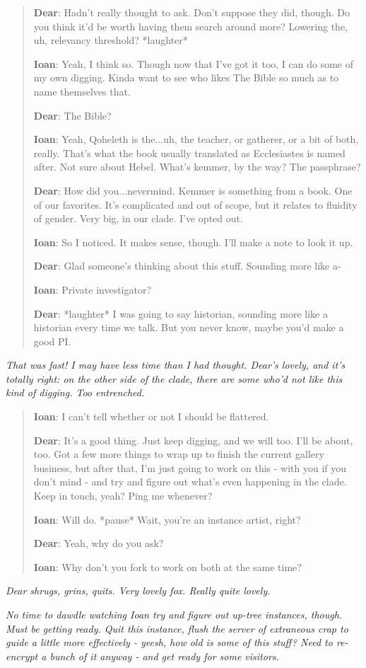 \begin{quote}
\textbf{Dear}: Hadn't really thought to ask. Don't suppose they did, though. Do you think it'd be worth having them search around more? Lowering the, uh, relevancy threshold? *laughter*

\textbf{Ioan}: Yeah, I think so. Though now that I've got it too, I can do some of my own digging. Kinda want to see who likes The Bible so much as to name themselves that.

\textbf{Dear}: The Bible?

\textbf{Ioan}: Yeah, Qoheleth is the...uh, the teacher, or gatherer, or a bit of both, really. That's what the book usually translated as Ecclesiastes is named after. Not sure about Hebel. What's kemmer, by the way? The passphrase?

\textbf{Dear}: How did you...nevermind. Kemmer is something from a book. One of our favorites. It's complicated and out of scope, but it relates to fluidity of gender. Very big, in our clade. I've opted out.

\textbf{Ioan}: So I noticed. It makes sense, though. I'll make a note to look it up.

\textbf{Dear}: Glad someone's thinking about this stuff. Sounding more like a-

\textbf{Ioan}: Private investigator?

\textbf{Dear}: *laughter* I was going to say historian, sounding more like a historian every time we talk. But you never know, maybe you'd make a good PI.
\end{quote}

\emph{That was fast! I may have less time than I had thought. Dear's lovely, and it's totally right: on the other side of the clade, there are some who'd not like this kind of digging. Too entrenched.}

\begin{quote}
\textbf{Ioan}: I can't tell whether or not I should be flattered.

\textbf{Dear}: It's a good thing. Just keep digging, and we will too. I'll be about, too. Got a few more things to wrap up to finish the current gallery business, but after that, I'm just going to work on this - with you if you don't mind - and try and figure out what's even happening in the clade. Keep in touch, yeah? Ping me whenever?

\textbf{Ioan}: Will do. *pause* Wait, you're an instance artist, right?

\textbf{Dear}: Yeah, why do you ask?

\textbf{Ioan}: Why don't you fork to work on both at the same time?
\end{quote}

\emph{Dear shrugs, grins, quits. Very lovely fox. Really quite lovely.}

\emph{No time to dawdle watching Ioan try and figure out up-tree instances, though. Must be getting ready. Quit this instance, flush the server of extraneous crap to guide a little more effectively - yeesh, how old is some of this stuff? Need to re-encrypt a bunch of it anyway - and get ready for some visitors.}
